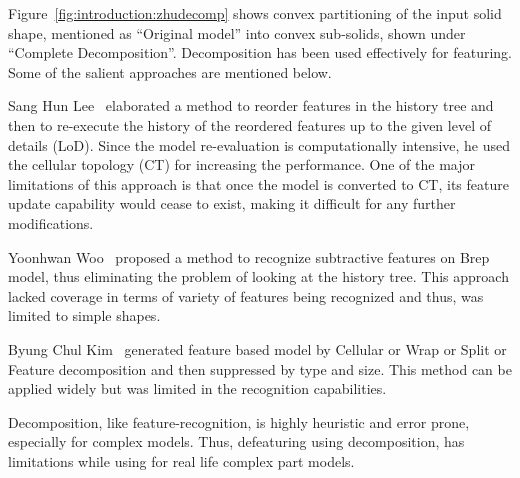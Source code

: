 
Figure~\ref{fig:introduction:zhudecomp} shows convex partitioning of the input solid shape, mentioned as ``Original model'' into convex sub-solids, shown under ``Complete Decomposition''. 
Decomposition has been used effectively for featuring. Some of the salient approaches are mentioned below.

Sang Hun Lee~\cite{Lee2005, SangHunLee2005, Lee2009} elaborated a method to reorder features in the history tree and then to re-execute the history of the reordered features up to the given level of details (LoD). Since the model re-evaluation is computationally intensive, he used the cellular topology (CT) for increasing the performance. One of the major limitations of this approach is that once the model is converted to CT, its feature update capability would cease to exist, making it difficult for any further modifications.

Yoonhwan Woo~\cite{Woo2009} proposed a method to recognize subtractive features on Brep model, thus eliminating the problem of looking at the history tree. This approach lacked coverage in terms of variety of features being recognized and thus, was limited to simple shapes.

Byung Chul Kim~\cite{Kim2014} generated  feature based model by Cellular or Wrap or Split or Feature decomposition and then suppressed by type and size. This method can be applied widely but was limited in the recognition capabilities.

Decomposition, like feature-recognition, is highly heuristic and error prone, especially for complex models. Thus, defeaturing using decomposition, has limitations while using for real life complex part models.



